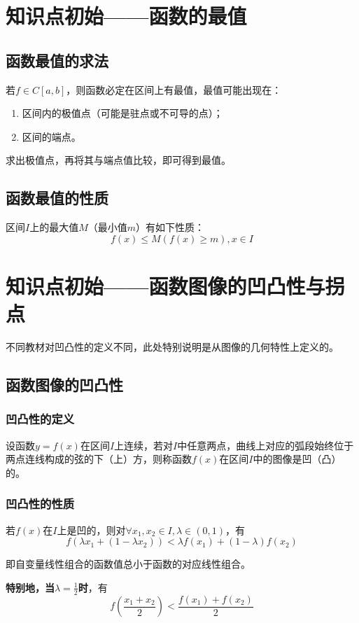 \section{知识点初始——函数的最值}
\subsection{函数最值的求法}
若$f\in C[a,b]$，则函数必定在区间上有最值，最值可能出现在：
\begin{enumerate}
	\item 区间内的极值点（可能是驻点或不可导的点）；
	\item 区间的端点。
\end{enumerate}

求出极值点，再将其与端点值比较，即可得到最值。
\subsection{函数最值的性质}
区间$I$上的最大值$M$（最小值$m$）有如下性质：
\[f(x)\leq M(f(x)\geq m),x\in I\]
\section{知识点初始——函数图像的凹凸性与拐点}
不同教材对凹凸性的定义不同，此处特别说明是从图像的几何特性上定义的。
\subsection{函数图像的凹凸性}
\subsubsection{凹凸性的定义}
\begin{definition}
	设函数$y=f(x)$在区间$I$上连续，若对$I$中任意两点，曲线上对应的弧段始终位于两点连线构成的弦的下（上）方，则称函数$f(x)$在区间$I$中的图像是凹（凸）的。
\end{definition}
\subsubsection{凹凸性的性质}
若$f(x)$在$I$上是凹的，则对$\forall x_1,x_2\in I,\lambda\in (0,1)$，有
\[f(\lambda x_1+(1-\lambda x_2))<\lambda f(x_1)+(1-\lambda)f(x_2)\]

即自变量线性组合的函数值总小于函数的对应线性组合。

\textbf{特别地，当$\lambda =\frac{1}{2}$时}，有
\[f(\frac{x_1+x_2}{2})<\frac{f(x_1)+f(x_2)}{2}\]

